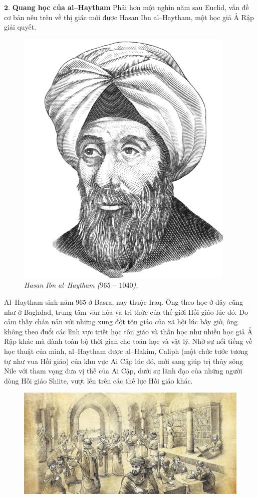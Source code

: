 \begin{multicols}{2}
	\vskip 0.1cm 
	$\pmb{2.}$ \textbf{\color{lichsutoanhoc}Quang học của al--Haytham}
	\vskip 0.1cm
	Phải hơn một nghìn năm sau Euclid, vấn đề cơ bản nêu trên về thị giác mới được Hasan Ibn al--Haytham, một học giả Ả Rập giải quyết.
	\begin{figure}[H]
		\vspace*{-5pt}
		\centering
		\captionsetup{labelformat= empty, justification=centering}
		\includegraphics[width= 0.7\linewidth]{2}
		\caption{\small\textit{\color{lichsutoanhoc}Hasan Ibn al--Haytham ($965-1040$).}}
		\vspace*{-10pt}
	\end{figure}
	Al--Haytham sinh năm $965$ ở Basra, nay thuộc Iraq. Ông theo học ở đây cũng như ở Baghdad, trung tâm văn hóa và tri thức của thế giới Hồi giáo lúc đó. Do cảm thấy chán nản với những xung đột tôn giáo của xã hội lúc bấy giờ, ông không theo đuổi các lĩnh vực triết học tôn giáo và thần học như nhiều học giả Ả Rập khác mà dành toàn bộ thời gian cho toán học và vật lý.
	\vskip 0.1cm
	Nhờ sự nổi tiếng về học thuật của mình, al--Haytham được al--Hakim, Caliph (một chức tước tương tự như vua Hồi giáo) của khu vực Ai Cập lúc đó, mời sang giúp trị thủy sông Nile với tham vọng đưa vị thế của Ai Cập, dưới sự lãnh đạo của những người dòng Hồi giáo Shiite, vượt lên trên các thế lực Hồi giáo khác.
	\begin{figure}[H]
		\vspace*{-5pt}
		\centering
		\captionsetup{labelformat= empty, justification=centering}
		\includegraphics[width= 1\linewidth]{3}

\end{figure}
\end{multicols}
